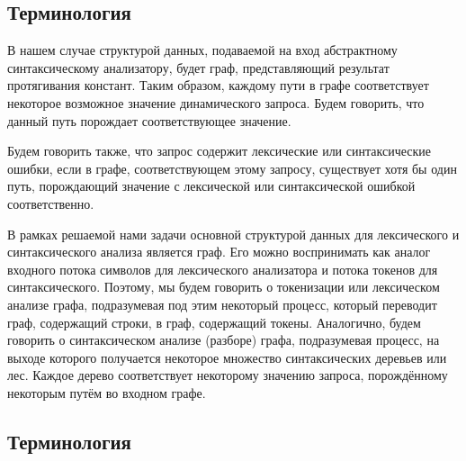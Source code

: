 \documentclass[a5paper]{article}
\begin{document}
\subsection{Терминология}

В нашем случае структурой данных,  подаваемой на вход абстрактному синтаксическому анализатору, будет граф, представляющий результат протягивания констант. Таким образом, каждому пути в графе соответствует некоторое возможное значение динамического запроса. Будем говорить, что данный путь порождает соответствующее значение.

Будем говорить также, что запрос содержит лексические или синтаксические ошибки, если в графе, соответствующем этому запросу, существует хотя бы один путь, порождающий значение с лексической или синтаксической ошибкой соответственно.

В рамках решаемой нами задачи основной структурой данных для лексического и синтаксического анализа является граф. Его можно воспринимать как аналог входного потока символов для лексического анализатора и потока токенов для синтаксического. Поэтому, мы будем говорить о токенизации или лексическом анализе графа, подразумевая под этим некоторый процесс, который переводит граф, содержащий строки, в граф, содержащий токены. Аналогично, будем говорить о синтаксическом анализе (разборе) графа, подразумевая процесс, на выходе которого получается некоторое множество синтаксических деревьев или лес. Каждое дерево соответствует некоторому значению запроса, порождённому некоторым путём во входном графе.

\subsection{Терминология}
\end{document}
